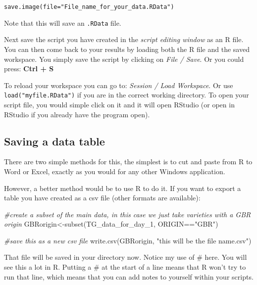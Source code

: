 \documentclass[
]{book}
\makeatletter
\newenvironment{Shaded}{\begin{snugshade}}{\end{snugshade}}
\newcommand{\CommentTok}[1]{\textcolor[rgb]{0.56,0.35,0.01}{\textit{#1}}}
\newcommand{\FunctionTok}[1]{\textcolor[rgb]{0.00,0.00,0.00}{#1}}
\newcommand{\NormalTok}[1]{#1}
\newcommand{\OtherTok}[1]{\textcolor[rgb]{0.56,0.35,0.01}{#1}}
\newcommand{\SpecialCharTok}[1]{\textcolor[rgb]{0.00,0.00,0.00}{#1}}
\newcommand{\StringTok}[1]{\textcolor[rgb]{0.31,0.60,0.02}{#1}}
\newenvironment{kframe}{%
\medskip{}
\setlength{\fboxsep}{.8em}
 \def\at@end@of@kframe{}%
 \ifinner\ifhmode%
  \def\at@end@of@kframe{\end{minipage}}%
  \begin{minipage}{\columnwidth}%
 \fi\fi%
 \def\FrameCommand##1{\hskip\@totalleftmargin \hskip-\fboxsep
 \colorbox{shadecolor}{##1}\hskip-\fboxsep
     \hskip-\linewidth \hskip-\@totalleftmargin \hskip\columnwidth}%
 \MakeFramed {\advance\hsize-\width
   \@totalleftmargin\z@ \linewidth\hsize
   \@setminipage}}%
 {\par\unskip\endMakeFramed%
 \at@end@of@kframe}
\newenvironment{rmdblock}[1]
  {
  \begin{itemize}
  \renewcommand{\labelitemi}{
    \raisebox{-.7\height}[0pt][0pt]{
      {\setkeys{Gin}{width=3em,keepaspectratio}\texttt{[image: images/\#1]}}
    }
  }
  \setlength{\fboxsep}{1em}
  \begin{kframe}
  \item
  }
  {
  \end{kframe}
  \end{itemize}
  }
\newenvironment{rmdtip}
  {\begin{rmdblock}{tip}}
  {\end{rmdblock}}
\makeatother
\begin{document}
\texttt{save.image(file="File\_name\_for\_your\_data.RData")}

Note that this will save an \texttt{.RData} file.

Next save the script you have created in the \emph{script editing window} as an R file. You can then come back to your results by loading both the R file and the saved workspace. You simply save the script by clicking on \emph{File / Save}.
Or you could press: \textbf{Ctrl + S}

To reload your workspace you can go to: \emph{Session / Load Workspace}. Or use \texttt{load("myfile.RData")} if you are in the correct working directory. To open your script file, you would simple click on it and it will open RStudio (or open in RStudio if you already have the program open).

\hypertarget{saving-a-data-table}{%
\subsection{Saving a data table}\label{saving-a-data-table}}

There are two simple methods for this, the simplest is to cut and paste from R to Word or Excel, exactly as you would for any other Windows application.

However, a better method would be to use R to do it. If you want to export a table you have created as a csv file (other formats are available):

\begin{Shaded}
\begin{Highlighting}[]
\CommentTok{\#create a subset of the main data, in this case we just take varieties with a GBR origin}
\NormalTok{GBRorigin}\OtherTok{\textless{}{-}}\FunctionTok{subset}\NormalTok{(TG\_data\_for\_day\_1, ORIGIN}\SpecialCharTok{==}\StringTok{"GBR"}\NormalTok{)}

\CommentTok{\#save this as a new csv file}
\FunctionTok{write.csv}\NormalTok{(GBRorigin, }\StringTok{"this will be the file name.csv"}\NormalTok{)}
\end{Highlighting}
\end{Shaded}

\begin{rmdtip}
That file will be saved in your directory now. Notice my use of \# here. You will see this a lot in R. Putting a \# at the start of a line means that R won't try to run that line, which means that you can add notes to yourself within your scripts.
\end{rmdtip}
\end{document}

